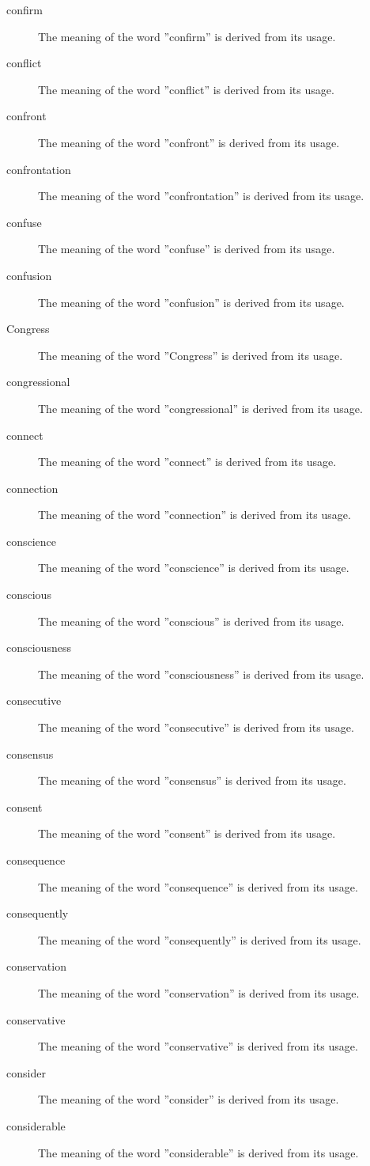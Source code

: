 \documentclass[12pt, letterpaper]{memoir}
\begin{document}
\begin{description}
\item[confirm] The meaning of the word ''confirm'' is derived from its usage.
\item[conflict] The meaning of the word ''conflict'' is derived from its usage.
\item[confront] The meaning of the word ''confront'' is derived from its usage.
\item[confrontation] The meaning of the word ''confrontation'' is derived from its usage.
\item[confuse] The meaning of the word ''confuse'' is derived from its usage.
\item[confusion] The meaning of the word ''confusion'' is derived from its usage.
\item[Congress] The meaning of the word ''Congress'' is derived from its usage.
\item[congressional] The meaning of the word ''congressional'' is derived from its usage.
\item[connect] The meaning of the word ''connect'' is derived from its usage.
\item[connection] The meaning of the word ''connection'' is derived from its usage.
\item[conscience] The meaning of the word ''conscience'' is derived from its usage.
\item[conscious] The meaning of the word ''conscious'' is derived from its usage.
\item[consciousness] The meaning of the word ''consciousness'' is derived from its usage.
\item[consecutive] The meaning of the word ''consecutive'' is derived from its usage.
\item[consensus] The meaning of the word ''consensus'' is derived from its usage.
\item[consent] The meaning of the word ''consent'' is derived from its usage.
\item[consequence] The meaning of the word ''consequence'' is derived from its usage.
\item[consequently] The meaning of the word ''consequently'' is derived from its usage.
\item[conservation] The meaning of the word ''conservation'' is derived from its usage.
\item[conservative] The meaning of the word ''conservative'' is derived from its usage.
\item[consider] The meaning of the word ''consider'' is derived from its usage.
\item[considerable] The meaning of the word ''considerable'' is derived from its usage.

\end{description}
\end{document}
